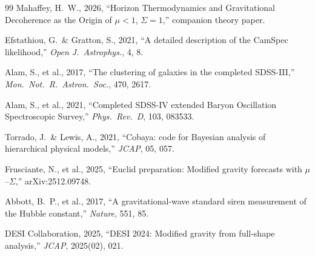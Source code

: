 \documentclass[11pt]{article}
\begin{document}
\begin{thebibliography}{99}
Mahaffey, H.~W., 2026, ``Horizon Thermodynamics and Gravitational
Decoherence as the Origin of $\mu < 1$, $\Sigma = 1$,'' companion
theory paper.

Efstathiou, G.\ \& Gratton, S., 2021, ``A detailed description of the
CamSpec likelihood,'' \textit{Open J.\ Astrophys.}, 4, 8.

Alam, S., et al., 2017, ``The clustering of galaxies in the completed
SDSS-III,'' \textit{Mon.\ Not.\ R.\ Astron.\ Soc.}, 470, 2617.

Alam, S., et al., 2021, ``Completed SDSS-IV extended Baryon Oscillation
Spectroscopic Survey,'' \textit{Phys.\ Rev.\ D}, 103, 083533.

Torrado, J.\ \& Lewis, A., 2021, ``Cobaya: code for Bayesian analysis
of hierarchical physical models,'' \textit{JCAP}, 05, 057.

Frusciante, N., et al., 2025, ``Euclid preparation: Modified gravity
forecasts with $\mu$--$\Sigma$,'' arXiv:2512.09748.

Abbott, B.~P., et al., 2017, ``A gravitational-wave standard siren
measurement of the Hubble constant,'' \textit{Nature}, 551, 85.

DESI Collaboration, 2025, ``DESI 2024: Modified gravity from full-shape
analysis,'' \textit{JCAP}, 2025(02), 021.

\end{thebibliography}
\end{document}
